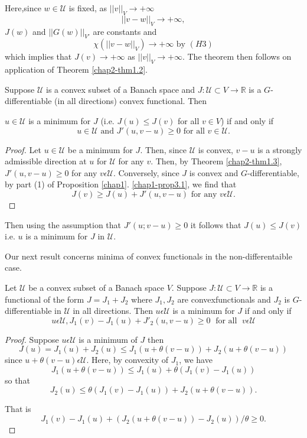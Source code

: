 Here,\pageoriginale since $w \in \mathcal{U}$ is fixed, as $||v||_{V} \to + \infty$
$$
||v-w||_{V} \to + \infty,
$$
$J(w)$ and $||G(w)||_{V'}$ are constants and
$$
\chi (||v-w||_{V}) \to + \infty \text{ by } (H3)
$$
which implies that $J(v) \to +\infty$ as $||v||_{V} \to + \infty$. The theorem then follows on application of Theorem \ref{chap2-thm1.2}.

\begin{theorem}\label{chap2-thm2.2}
Suppose $\mathcal{U}$ is a convex subset of a Banach space and $J : \mathcal{U} \subset V \to \mathbb{R}$ is a $G$-differentiable (in all directions) convex functional. Then

$u \in \mathcal{U}$ is a minimum for $J$ (i.e. $J(u) \leq J(v)$ for all $v \in V$) if and only if
$$
u \in \mathcal{U} \text{ and } J'(u, v - u) \geq 0 \text{ for all } v \in \mathcal{U}.
$$
\end{theorem}

\begin{proof}
Let $u \in \mathcal{U}$ be a minimum for $J$. Then, since $\mathcal{U}$ is convex, $v-u$ is a strongly admissible direction at $u$ for $\mathcal{U}$ for any $v$. Then, by Theorem \ref{chap2-thm1.3}, $J'(u, v-u) \geq 0$ for any $v \epsilon \mathcal{U}$. Conversely, since $J$ is convex and $G$-differentiable, by part (1) of Proposition \ref{chap1}. \ref{chap1-prop3.1}, we find that
$$
J(v) \geq J(u) + J'(u, v-u) \text{ for any } v \epsilon \mathcal{U}.
$$
\end{proof}

Then using the assumption that $J'(u ; v-u) \geq 0$ it follows that $J(u) \leq J(v)$ i.e. $u$ is a minimum for $J$ in $\mathcal{U}$.

Our next result concerns minima of convex functionals in the non-differentaible case.

\begin{theorem}\label{chap2-thm2.3}
Let $\mathcal{U}$ be a convex subset of a Banach space $V$. Suppose $J : \mathcal{U} \subset V \to \mathbb{R}$ is a functional of the form $J = J_{1} + J_{2}$ where $J_{1}, J_{2}$ are convex\pageoriginale functionals and $J_{2}$ is $G$-differentiable in $\mathcal{U}$ in all directions. Then $u \epsilon \mathcal{U}$ is a minimum for $J$
if and only if
$$
u \epsilon \mathcal{U}, J_{1}(v) - J_{1}(u) + J'_{2}(u, v-u) \geq 0 \; \text{ for all }  \; v \epsilon \mathcal{U}
$$
\end{theorem}

\begin{proof}
Suppose $u \epsilon \mathcal{U}$ is a minimum of $J$ then
$$
J(u) = J_{1}(u) + J_{2}(u) \leq J_{1} (u + \theta (v-u)) + J_{2}(u+\theta(v-u))
$$
since $u + \theta(v-u) \epsilon \mathcal{U}$. Here, by convexity of $J_{1}$, we have
$$
J_{1}(u+\theta(v-u)) \leq J_{1}(u) + \theta(J_{1}(v) - J_{1}(u))
$$
so that
$$
J_{2}(u) \leq \theta(J_{1}(v) - J_{1}(u)) + J_{2}(u+\theta(v-u)).
$$

That is 
$$
J_{1}(v) - J_{1}(u) + (J_{2}(u+\theta(v-u)) - J_{2}(u))/\theta \geq 0.
$$
\end{proof}

